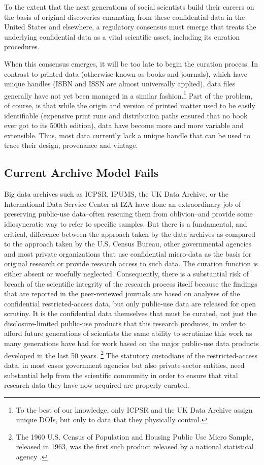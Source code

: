 To the extent that the next generations of social scientists build their
careers on the basis of original discoveries emanating from these
confidential data in the United States and elsewhere, a regulatory consensus
must emerge that treats the underlying confidential data as a vital
scientific asset, including its curation procedures.

When this consensus emerges, it will be too late to begin the curation
process. In contrast to printed data (otherwise known as books and
journals), which have unique handles (\ac{ISBN} and \ac{ISSN} are almost
universally applied), data files generally have not yet been managed in a
similar fashion.\footnote{%
To the best of our knowledge, only \ac{ICPSR} and the UK Data Archive assign
unique \acp{DOI}, but only to data that they physically control.} Part of
the problem, of course, is that while the origin and version of printed
matter used to be easily identifiable (expensive print runs and distribution
paths ensured that no book ever got to its 500th edition), data have become
more and more variable and extensible. Thus, most data currently lack a
unique handle that can be used to trace their design, provenance and vintage.

\subsection{Current Archive Model Fails}

Big data archives such as \ac{ICPSR}, \ac{IPUMS}, the UK Data Archive, or
the International Data Service Center at IZA have done an extraordinary job
of preserving public-use data--often rescuing them from oblivion--and
provide some idiosyncratic way to refer to specific samples. But there is a
fundamental, and critical, difference between the approach taken by the data
archives as compared to the approach taken by the U.S. Census Bureau, other
governmental agencies and most private organizations that use confidential
micro-data as the basis for original research or provide research access to
such data. The curation function is either absent or woefully neglected.
Consequently, there is a substantial risk of breach of the scientific
integrity of the research process itself because the findings that are
reported in the peer-reviewed journals are based on analyses of the
confidential restricted-access data, but only public-use data are released
for open scrutiny. It is the confidential data themselves that must be
curated, not just the disclosure-limited public-use products that this
research produces, in order to afford future generations of scientists the
same ability to scrutinize this work as many generations have had for work
based on the major public-use data products developed in the last 50 years.%
\footnote{%
The 1960 U.S. Census of Population and Housing Public Use Micro Sample,
released in 1963, was the first such product released by a national
statistical agency \cite{Ruggles1991}.} The statutory custodians of the
restricted-access data, in most cases government agencies but also
private-sector entities, need substantial help from the scientific community
in order to ensure that vital research data they have now acquired are
properly curated.

